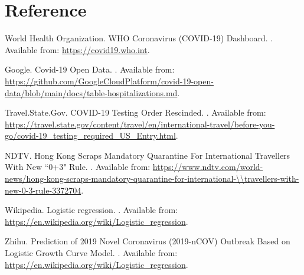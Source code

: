 \documentclass[12pt]{article}
\begin{document}
	\section*{Reference}
	\begin{thebibliography}{99}
		
	World Health Organization.
	\newblock WHO Coronavirus (COVID-19) Dashboard.
	.
	\newblock Available from: \url{https://covid19.who.int}.
	
	Google.
	\newblock Covid-19 Open Data.
	.
	\newblock Available from: \url{https://github.com/GoogleCloudPlatform/covid-19-open-data/blob/main/docs/table-hospitalizations.md}.
	
	Travel.State.Gov.
	\newblock COVID-19 Testing Order Rescinded.
	.
	\newblock Available from: \url{https://travel.state.gov/content/travel/en/international-travel/before-you-go/covid-19_testing_required_US_Entry.html}.
	
	NDTV.
	\newblock Hong Kong Scraps Mandatory Quarantine For International Travellers With New ``0+3" Rule.
	.
	\newblock Available from: \url{https://www.ndtv.com/world-news/hong-kong-scraps-mandatory-quarantine-for-international-\\travellers-with-new-0-3-rule-3372704}.
	
	Wikipedia.
	\newblock Logistic regression.
	.
	\newblock Available from: \url{https://en.wikipedia.org/wiki/Logistic_regression}.
	
	
	Zhihu.
	\newblock Prediction of 2019 Novel Coronavirus (2019-nCOV) Outbreak Based on Logistic Growth Curve Model.
	.
	\newblock Available from: \url{https://en.wikipedia.org/wiki/Logistic_regression}.
		
	\end{thebibliography}
\end{document}
